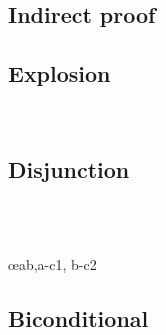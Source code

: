 \begin{multicols}{2}
\subsection*{Indirect proof}

\begin{fitchproof}
\open
\close
{}
\end{fitchproof}


\subsection*{Explosion}

\begin{fitchproof}
\\
\end{fitchproof}

\subsection*{Disjunction}

\begin{fitchproof}

\\	

\\	\open
	\close
	\open
	\close
	 \oe{ab,a-c1, b-c2}
\end{fitchproof}

\subsection*{Biconditional}

\begin{fitchproof}
	\open
	\close
	\open
	\close

\\	
	 

\\	
	 
\end{fitchproof}

\end{multicols}


